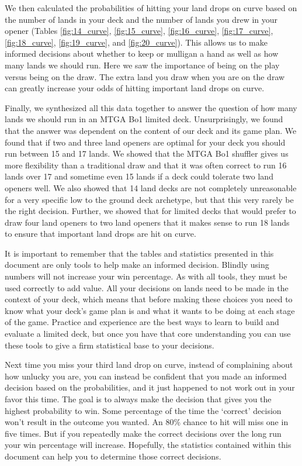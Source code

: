 \documentclass[oneside]{book}   %
\begin{document}
We then calculated the probabilities of hitting your land drops on curve based on the number of lands in your deck and the number of lands you drew in your opener (Tables \ref{fig:14_curve}, \ref{fig:15_curve}, \ref{fig:16_curve}, \ref{fig:17_curve}, \ref{fig:18_curve}, \ref{fig:19_curve}, and \ref{fig:20_curve}). This allows us to make informed decisions about whether to keep or mulligan a hand as well as how many lands we should run. Here we saw the importance of being on the play versus being on the draw. The extra land you draw when you are on the draw can greatly increase your odds of hitting important land drops on curve. 

Finally, we synthesized all this data together to answer the question of how many lands we should run in an MTGA Bo1 limited deck. Unsurprisingly, we found that the answer was dependent on the content of our deck and its game plan. We found that if two and three land openers are optimal for your deck you should run between 15 and 17 lands. We showed that the MTGA Bo1 shuffler gives us more flexibility than a traditional draw and that it was often correct to run 16 lands over 17 and sometime even 15 lands if a deck could tolerate two land openers well. We also showed that 14 land decks are not completely unreasonable for a very specific low to the ground deck archetype, but that this very rarely be the right decision. Further, we showed that for limited decks that would prefer to draw four land openers to two land openers that it makes sense to run 18 lands to ensure that important land drops are hit on curve.

It is important to remember that the tables and statistics presented in this document are only tools to help make an informed decision. Blindly using numbers will not increase your win percentage. As with all tools, they must be used correctly to add value. All your decisions on lands need to be made in the context of your deck, which means that before making these choices you need to know what your deck's game plan is and what it wants to be doing at each stage of the game. Practice and experience are the best ways to learn to build and evaluate a limited deck, but once you have that core understanding you can use these tools to give a firm statistical base to your decisions.

Next time you miss your third land drop on curve, instead of complaining about how unlucky you are, you can instead be confident that you made an informed decision based on the probabilities, and it just happened to not work out in your favor this time. The goal is to always make the decision that gives you the highest probability to win. Some percentage of the time the `correct' decision won't result in the outcome you wanted. An 80\% chance to hit will miss one in five times. But if you repeatedly make the correct decisions over the long run your win percentage will increase. Hopefully, the statistics contained within this document can help you to determine those correct decisions.
\end{document}
